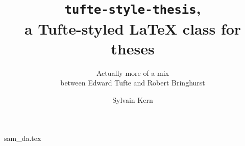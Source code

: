 \documentclass[
    10pt,
	colorful,
	boxey,
 a4paper,
]{tufte-style-thesis}
\author{Sylvain Kern}
\title{\texttt{tufte-style-thesis},\\a Tufte-styled \LaTeX{} class for theses}
\subtitle{Actually more of a mix\\between Edward Tufte and Robert Bringhurst}
\begin{document}
\ifdebug
    \layout
\fi


\frontmatter

%
%

\tableofcontents
\listoffigures
\listoftables



\mainmatter

{sam_da.tex}


\backmatter

\thispagestyle{empty}
\printbibliography
\cleardoublepage
\end{document}
